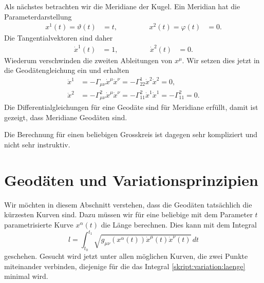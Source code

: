 Als nächstes betrachten wir die Meridiane der Kugel.
Ein Meridian hat die Parameterdarstellung
\[
\begin{aligned}
x^1(t)=\vartheta(t)&=t,
&\qquad&&
x^2(t)=\varphi(t)&=0.
\end{aligned}
\]
Die Tangentialvektoren sind daher
\[
\begin{aligned}
\dot x^1(t)&=1,
&\qquad&&
\dot x^2(t)&=0.
\end{aligned}
\]
Wiederum verschwinden
die zweiten Ableitungen von $x^\mu$.
Wir setzen dies jetzt in die Geodäten\-gleichung ein und erhalten
\begin{align*}
\ddot x^1
&=
-\Gamma_{\mu\nu}\dot x^\mu \dot x^\nu
=
-\Gamma_{22}^1\dot x^2 \dot x^2
=
0,
\\
\ddot x^2
&=
-\Gamma_{\mu\nu}^2\dot x^\mu \dot x^\nu
=
-\Gamma_{11}^2\dot x^1\dot x^1
=
-\Gamma_{11}^2
=
0.
\end{align*}
Die Differentialgleichungen für eine Geodäte sind für Meridiane erfüllt,
damit ist gezeigt, dass Meridiane Geodäten sind.

Die Berechnung für einen beliebigen Grosskreis ist dagegen sehr 
kompliziert und nicht sehr instruktiv.

\section{Geodäten und Variationsprinzipien%
\label{skript:geodaeten:section:variationsprinzip}}
Wir möchten in diesem Abschnitt verstehen, dass die Geodäten tatsächlich 
die kürzesten Kurven sind.
Dazu müssen wir für eine beliebige mit dem Parameter $t$ parametrisierte
Kurve $x^\alpha(t)$ die Länge berechnen.
Dies kann mit dem Integral
\begin{equation}
l=\int_{t_0}^{t_1} \sqrt{g_{\mu\nu}(x^\alpha(t)) \dot x^\mu(t)\dot x^\nu(t)}\,dt
\label{skript:variation:laenge}
\end{equation}
geschehen.
Gesucht wird jetzt unter allen möglichen Kurven, die zwei Punkte miteinander
verbinden, diejenige für die das Integral \eqref{skript:variation:laenge}
minimal wird.

